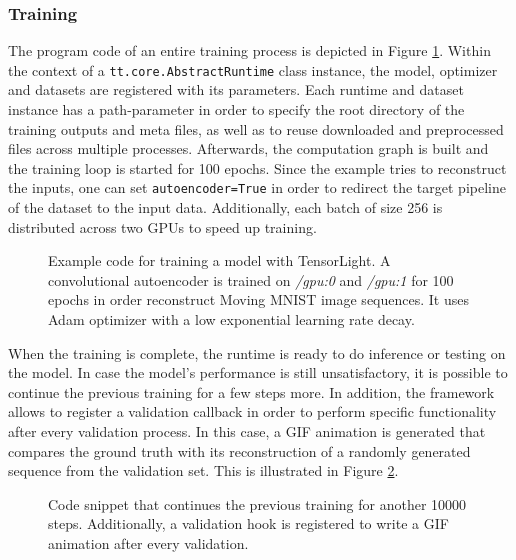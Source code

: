 \subsubsection*{Training}

The program code of an entire training process is depicted in Figure \ref{code:runtime_train}. Within the context of a \texttt{tt.core.AbstractRuntime} class instance, the model, optimizer and datasets are registered with its parameters. Each runtime and dataset instance has a path-parameter in order to specify the root directory of the training outputs and meta files, as well as to reuse downloaded and preprocessed files across multiple processes. Afterwards, the computation graph is built and the training loop is started for \num{100} epochs. Since the example tries to reconstruct the inputs, one can set \texttt{autoencoder=True} in order to redirect the target pipeline of the dataset to the input data. Additionally, each batch of size \num{256} is distributed across two GPUs to speed up training.

\begin{figure}[htpb]
  
  \caption[Code: Training with TensorLight]{Example code for training a model with TensorLight. A convolutional autoencoder is trained on \textit{/gpu:0} and \textit{/gpu:1} for \num{100} epochs in order reconstruct Moving MNIST image sequences. It uses Adam optimizer with a low exponential learning rate decay.}
  \label{code:runtime_train}
\end{figure}

When the training is complete, the runtime is ready to do inference or testing on the model. In case the model's performance is still unsatisfactory, it is possible to continue the previous training for a few steps more. In addition, the framework allows to register a validation callback in order to perform specific functionality after every validation process. In this case, a GIF animation is generated that compares the ground truth with its reconstruction of a randomly generated sequence from the validation set. This is illustrated in Figure \ref{code:runtime_hook}.

\begin{figure}[htpb]
  
  \caption[Code: Continuing Training and Validation Hooks in TensorLight]{Code snippet that continues the previous training for another \num{10000} steps. Additionally, a validation hook is registered to write a GIF animation after every validation.}
  \label{code:runtime_hook}
\end{figure}


